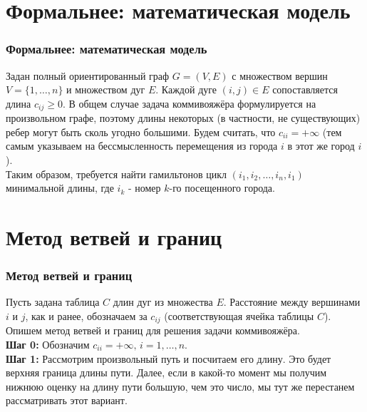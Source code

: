 \documentclass{beamer}
\begin{document}
\section{Формальнее: математическая модель}

\begin{frame}
\frametitle{Формальнее: математическая модель}
Задан полный ориентированный граф $G = (V, E)$ с множеством вершин $V = \{1, …, n\}$ и множеством дуг $E$. Каждой дуге $(i, j) \in E$ сопоставляется
длина $c_{ij} \geq 0$. В общем случае задача коммивояжёра формулируется на
произвольном графе, поэтому длины некоторых (в частности, не существующих) ребер могут быть сколь угодно большими. Будем считать, что
$c_{ii} = +\infty$ (тем самым указываем на бессмысленность перемещения из города $i$ в этот же город $i$).\\
Таким образом, требуется найти гамильтонов цикл $(i_1, i_2, \ldots, i_n, i_1)$ минимальной длины, где $i_k$ - номер $k$-го посещенного города.

\end{frame}






\section{Метод ветвей и границ}


\begin{frame}
\frametitle{Метод ветвей и границ}
Пусть задана таблица $C$ длин дуг из множества $E$. Расстояние между вершинами $i$ и $j$, как и ранее, обозначаем за $c_{ij}$ (соответствующая ячейка таблицы $C$). Опишем метод ветвей и границ для решения задачи коммивояжёра.\\
\textbf{Шаг 0:} Обозначим $c_{ii} = +\infty,\,i = 1, \ldots, n$.\\
\textbf{Шаг 1:} Рассмотрим произвольный путь и посчитаем его длину. Это будет верхняя граница длины пути. Далее, если в какой-то момент мы получим нижнюю оценку на длину пути большую, чем это число, мы тут же перестанем рассматривать этот вариант.\\
\end{frame}
\end{document}
